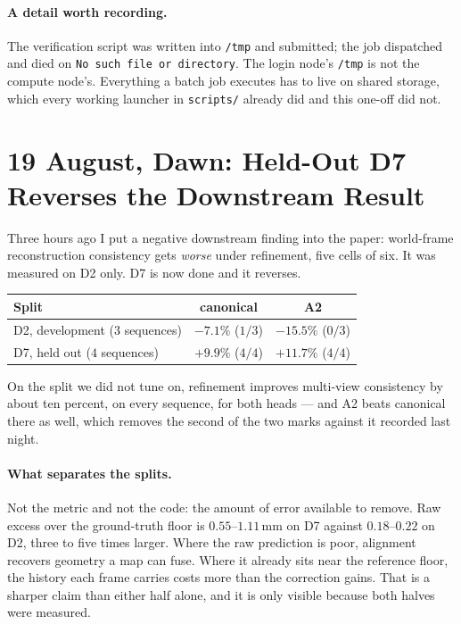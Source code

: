 \documentclass[11pt,a4paper]{article}
\begin{document}
\paragraph{A detail worth recording.} The verification script was written into
\texttt{/tmp} and submitted; the job dispatched and died on \texttt{No such file
or directory}. The login node's \texttt{/tmp} is not the compute node's.
Everything a batch job executes has to live on shared storage, which every
working launcher in \texttt{scripts/} already did and this one-off did not.


\section*{19 August, Dawn: Held-Out D7 Reverses the Downstream Result}

Three hours ago I put a negative downstream finding into the paper: world-frame
reconstruction consistency gets \emph{worse} under refinement, five cells of six.
It was measured on D2 only. D7 is now done and it reverses.

\begin{center}
\begin{tabular}{lcc}
\toprule
Split & canonical & A2 \\
\midrule
D2, development ($3$ sequences) & $-7.1\%$ \; ($1/3$) & $-15.5\%$ \; ($0/3$) \\
D7, held out ($4$ sequences)    & $\mathbf{+9.9\%}$ \; ($4/4$) & $\mathbf{+11.7\%}$ \; ($4/4$) \\
\bottomrule
\end{tabular}
\end{center}

On the split we did not tune on, refinement improves multi-view consistency by
about ten percent, on every sequence, for both heads --- and A2 beats canonical
there as well, which removes the second of the two marks against it recorded
last night.

\paragraph{What separates the splits.} Not the metric and not the code: the
amount of error available to remove. Raw excess over the ground-truth floor is
$0.55$--$1.11$\,mm on D7 against $0.18$--$0.22$ on D2, three to five times
larger. Where the raw prediction is poor, alignment recovers geometry a map can
fuse. Where it already sits near the reference floor, the history each frame
carries costs more than the correction gains. That is a sharper claim than
either half alone, and it is only visible because both halves were measured.
\end{document}
